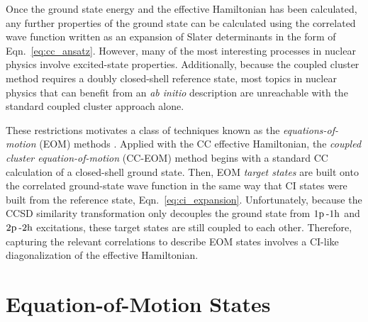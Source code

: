 \documentclass[thesis.tex]{subfiles}
\begin{document}
Once the ground state energy and the effective Hamiltonian has been calculated, any further properties of the ground state can be calculated using the correlated wave function written as an expansion of Slater determinants in the form of Eqn.\ \eqref{eq:cc_ansatz}.  However, many of the most interesting processes in nuclear physics involve excited-state properties.  Additionally, because the coupled cluster method requires a doubly closed-shell reference state, most topics in nuclear physics that can benefit from an \emph{ab initio} description are unreachable with the standard coupled cluster approach alone.

These restrictions motivates a class of techniques known as the \textit{equations-of-motion} (EOM) methods \cite{ROWE1968}.  Applied with the CC effective Hamiltonian, the \textit{coupled cluster equation-of-motion} (CC-EOM) method begins with a standard CC calculation of a closed-shell ground state.  Then, EOM \textit{target states} are built onto the correlated ground-state wave function in the same way that CI states were built from the reference state, Eqn.\ \eqref{eq:ci_expansion}.  Unfortunately, because the CCSD similarity transformation only decouples the ground state from $1\mathrm{p}\hspace{2pt}\text{-}1\mathrm{h}$ and $2\mathrm{p}\hspace{2pt}\text{-}2\mathrm{h}$ excitations, these target states are still coupled to each other.  Therefore, capturing the relevant correlations to describe EOM states involves a CI-like diagonalization of the effective Hamiltonian.


\section{Equation-of-Motion States} \label{section:eom_target_states}
\end{document}

